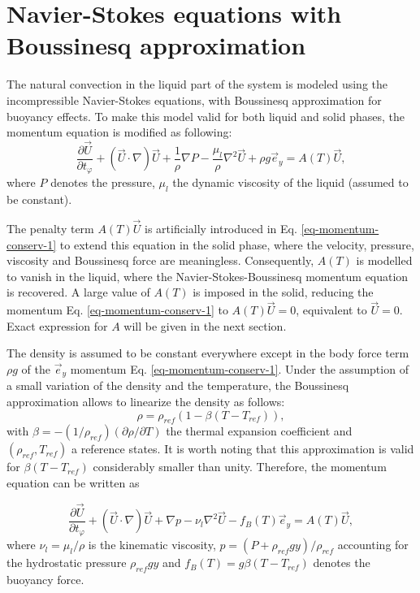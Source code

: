 \section{Navier-Stokes equations with Boussinesq approximation}

The natural convection in the liquid part of the system is modeled using the incompressible Navier-Stokes equations, with  Boussinesq approximation for buoyancy effects. To make this model valid for both liquid and solid phases, the momentum equation is modified as following:
\begin{equation}\label{eq-momentum-conserv-1}
\frac{\partial \vec{U}}{\partial t_{\varphi}} +   {(\vec{U}\cdot\nabla ) \vec{U}} + \frac{1}{\rho}\nabla P - \frac{\mu_{l}}{\rho}   {\nabla^2 \vec{U}} 
+ \rho g \vec{e}_y= A(T) \vec{U},
\end{equation}
where $P$ denotes the pressure, $\mu_{l}$ the dynamic viscosity of the liquid (assumed to be constant).  

The penalty term $A(T) \vec{U}$ is artificially introduced in Eq. \ref{eq-momentum-conserv-1} to extend this equation in the solid phase, where the velocity, pressure, viscosity and Boussinesq force are meaningless.  Consequently, $A(T)$  is modelled to vanish in the liquid, where the Navier-Stokes-Boussinesq momentum equation is recovered. A large value of $A(T)$ is imposed in the solid, reducing the momentum Eq. \ref{eq-momentum-conserv-1}  to $A(T) \vec{U}=0$, equivalent to $\vec{U}=0$. Exact expression for $A$ will be given in the next section.

The density is assumed to be constant everywhere except in the body force term $\rho g$ of the $\vec e_y$ momentum Eq. \ref{eq-momentum-conserv-1}.
Under the assumption of a small variation of the density and the temperature, the Boussinesq approximation allows to linearize the density as follows:
\begin{equation}
   \rho = \rho_{ref} (1 - \beta (T-T_{ref})),
\end{equation}
with $\beta = - (1/\rho_{ref}) (\partial \rho / \partial T)$ the thermal expansion coefficient and $(\rho_{ref},T_{ref})$ a reference states.
It is worth noting that this approximation is valid for $\beta (T - T_{ref})$ considerably smaller than unity.
Therefore, the momentum equation can be written as

\begin{equation}\label{eq-momentum-conserv}
  \frac{\partial \vec{U}}{\partial t_{\varphi}} +   {(\vec{U}\cdot\nabla ) \vec{U}} + \nabla p - \nu_{l}  {\nabla^2 \vec{U}} 
- f_B(T) \vec{e}_y= A(T) \vec{U},
\end{equation}
where  $\nu_l = \mu_l/\rho$ is the kinematic viscosity,  $p = (P + \rho_{ref} g y)/ \rho_{ref}$ accounting for the hydrostatic pressure $\rho_{ref} g y$ and $f_B(T) = g \beta (T-T_{ref})$ denotes the buoyancy force.

